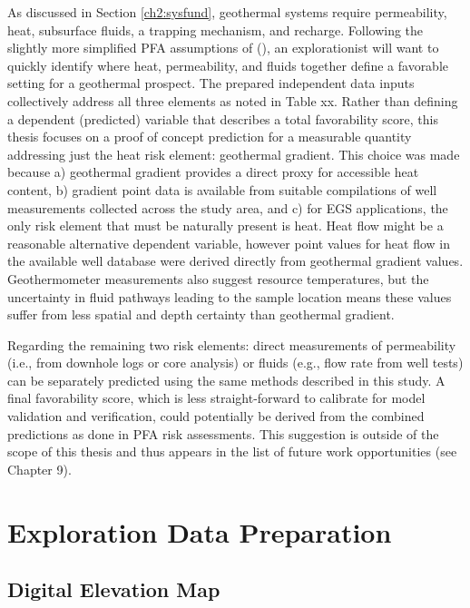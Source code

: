 As discussed in Section \ref{ch2:sysfund}, geothermal systems require permeability, heat, subsurface fluids, a trapping mechanism, and recharge. Following the slightly more simplified PFA assumptions of \citeauthor{bielicki_hydrogeolgic_2015} (\citeyear{bielicki_hydrogeolgic_2015}), an explorationist will want to quickly identify where heat, permeability, and fluids together define a favorable setting for a geothermal prospect. The prepared independent data inputs collectively address all three elements as noted in Table xx. Rather than defining a dependent (predicted) variable that describes a total favorability score, this thesis focuses on a proof of concept prediction for a measurable quantity addressing just the heat risk element: geothermal gradient. This choice was made because a) geothermal gradient provides a direct proxy for accessible heat content, b) gradient point data is available from suitable compilations of well measurements collected across the study area, and c) for EGS applications, the only risk element that must be naturally present is heat. Heat flow might be a reasonable alternative dependent variable, however point values for heat flow in the available well database were derived directly from geothermal gradient values. Geothermometer measurements also suggest resource temperatures, but the uncertainty in fluid pathways leading to the sample location means these values suffer from less spatial and depth certainty than geothermal gradient.

Regarding the remaining two risk elements: direct measurements of permeability (i.e., from downhole logs or core analysis) or fluids (e.g., flow rate from well tests) can be separately predicted using the same methods described in this study. A final favorability score, which is less straight-forward to calibrate for model validation and verification, could potentially be derived from the combined predictions as done in PFA risk assessments. This suggestion is outside of the scope of this thesis and thus appears in the list of future work opportunities (see Chapter 9).

\section{Exploration Data Preparation}

\subsection{Digital Elevation Map}
